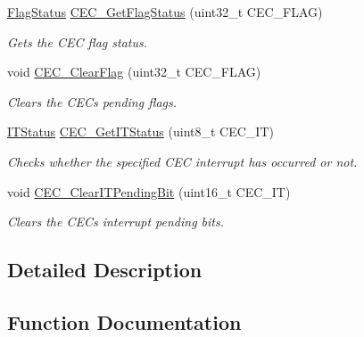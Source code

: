 \begin{DoxyCompactItemize}
\mbox{\hyperlink{group___exported__types_ga89136caac2e14c55151f527ac02daaff}{Flag\+Status}} \mbox{\hyperlink{group___c_e_c___private___functions_gaf920706cb350182bf0728c66868053ca}{C\+E\+C\+\_\+\+Get\+Flag\+Status}} (uint32\+\_\+t C\+E\+C\+\_\+\+F\+L\+AG)
\begin{DoxyCompactList}\small\item\em Gets the C\+EC flag status. \end{DoxyCompactList}\item 
void \mbox{\hyperlink{group___c_e_c___private___functions_ga928b373fb5972204c56f9c64113f8c67}{C\+E\+C\+\_\+\+Clear\+Flag}} (uint32\+\_\+t C\+E\+C\+\_\+\+F\+L\+AG)
\begin{DoxyCompactList}\small\item\em Clears the C\+EC\textquotesingle{}s pending flags. \end{DoxyCompactList}\item 
\mbox{\hyperlink{group___exported__types_gaacbd7ed539db0aacd973a0f6eca34074}{I\+T\+Status}} \mbox{\hyperlink{group___c_e_c___private___functions_gaa1940a388d0bfcefe7483fb74cc2ba1d}{C\+E\+C\+\_\+\+Get\+I\+T\+Status}} (uint8\+\_\+t C\+E\+C\+\_\+\+IT)
\begin{DoxyCompactList}\small\item\em Checks whether the specified C\+EC interrupt has occurred or not. \end{DoxyCompactList}\item 
void \mbox{\hyperlink{group___c_e_c___private___functions_gade646921262a077172c708953822f248}{C\+E\+C\+\_\+\+Clear\+I\+T\+Pending\+Bit}} (uint16\+\_\+t C\+E\+C\+\_\+\+IT)
\begin{DoxyCompactList}\small\item\em Clears the C\+EC\textquotesingle{}s interrupt pending bits. \end{DoxyCompactList}\end{DoxyCompactItemize}


\subsection{Detailed Description}


\subsection{Function Documentation}
\mbox{\label{group___c_e_c___private___functions_ga928b373fb5972204c56f9c64113f8c67}} 

